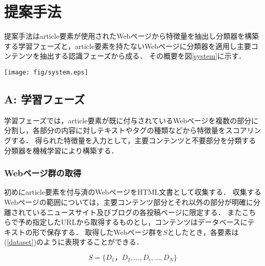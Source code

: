 \documentclass[a4paper,10pt,twocolumn]{jsarticle}
\begin{document}
\section{提案手法}

提案手法はarticle要素が使用されたWebページから特徴量を抽出し分類器を構築する学習フェーズと，article要素を持たないWebページに分類器を適用し主要コンテンツを抽出する認識フェーズから成る．
その概要を図\ref{system}に示す．

\begin{figure*}[hbtp]
\vspace{2mm}
\begin{center}
\texttt{[image: fig/system.eps]}
\end{center}
\vspace{-6mm}
\caption{提案手法の概要図}
\label{system}
\end{figure*}
\vspace{2mm}

\subsection{A: 学習フェーズ}

学習フェーズでは，article要素が既に付与されているWebページを複数の部分に分割し，各部分の内容に対しテキストやタグの種類などから特徴量をスコアリングする．
得られた特徴量を入力として，主要コンテンツと不要部分を分類する分類器を機械学習により構築する．

\renewcommand{\thesubsubsection}{\Alph{subsection}-\Roman{subsubsection}}

\subsubsection{Webページ群の取得}\label{getwebpages}

初めにarticle要素を付与済のWebページをHTML文書として収集する．
収集するWebページの範囲については，主要コンテンツ部分とそれ以外の部分が明確に分離されているニュースサイト及びブログの各投稿ページに限定する．
またこちらで予め指定したURLから取得するものとし，コンテンツはデータベースにテキストの形で保存する．
取得したWebページ群を$S$としたとき，各要素は(\ref{dataset})のように表現することができる．

\begin{equation}
  S=\{D_1，D_2,\dots, D_i,\dots, D_N\} \label{dataset}
\end{equation}
\end{document}
